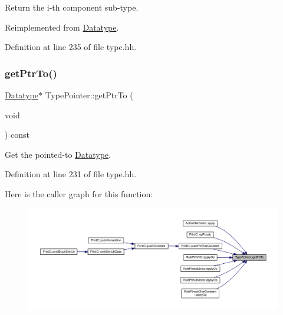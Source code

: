 Return the i-\/th component sub-\/type. 



Reimplemented from \mbox{\hyperlink{class_datatype_a512d26d59082eeaef1351a7c448d6447}{Datatype}}.



Definition at line 235 of file type.\+hh.

\mbox{\label{class_type_pointer_a670e83f887a645c91633a7fa54c60420}} 
\subsubsection{\texorpdfstring{getPtrTo()}{getPtrTo()}}
{\footnotesize\ttfamily \mbox{\hyperlink{class_datatype}{Datatype}}$\ast$ Type\+Pointer\+::get\+Ptr\+To (\begin{DoxyParamCaption}\item[{void}]{ }\end{DoxyParamCaption}) const\hspace{0.3cm}{\ttfamily [inline]}}



Get the pointed-\/to \mbox{\hyperlink{class_datatype}{Datatype}}. 



Definition at line 231 of file type.\+hh.

Here is the caller graph for this function\+:
\nopagebreak
\begin{figure}[H]
\begin{center}
\leavevmode
\includegraphics[width=350pt]{class_type_pointer_a670e83f887a645c91633a7fa54c60420_icgraph}
\end{center}
\end{figure}
\mbox{\label{class_type_pointer_a6991671504f1098ccba2bcc40adcd3e9}} 
